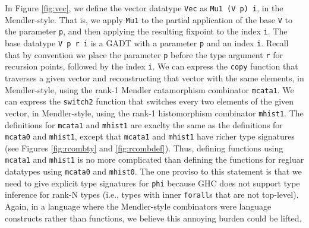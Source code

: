 \documentclass[letterpaper,12pt]{article}
\begin{document}
In Figure \ref{fig:vec}, we define the vector datatype \verb|Vec| as
\verb|Mu1 (V p) i|, in the Mendler-style.
That is, we apply \verb|Mu1| to the partial application of the base \verb|V| to
the parameter \verb|p|, and then applying the resulting fixpoint to the index \verb|i|.
The base datatype \verb|V p r i| is a GADT with a parameter \verb|p| and an index \verb|i|.
Recall that by convention we place the parameter \verb|p| before
the type argument \verb|r| for recursion points, followed by the index \verb|i|.
We can express the \verb|copy| function that traverses a given vector and
reconstructing that vector with the same elements, in Mendler-style,
using the rank-1 Mendler catamorphism combinator \verb|mcata1|.  We can express
the \verb|switch2| function that switches every two elements of the given vector,
in Mendler-style, using the rank-1 histomorphism combinator \verb|mhist1|.
The definitions for \verb|mcata1| and \verb|mhist1| are exaclty the same as
the definitions for \verb|mcata0| and \verb|mhist1|, except that \verb|mcata1| and \verb|mhist1|
have richer type signatures
(see Figures \ref{fig:rcombty} and \ref{fig:rcombdef}).
Thus, defining functions using \verb|mcata1| and \verb|mhist1| is no more complicated
than defining the functions for regluar datatypes using \verb|mcata0| and \verb|mhist0|.
The one proviso to this statement is that we need to give explicit
type signatures for \verb|phi| because GHC does not support type inference
for rank-N types (i.e., types with inner \texttt{forall}s that are not top-level).
Again, in a language where the Mendler-style combinators were
language constructs rather than functions, we believe this annoying burden
could be lifted.
\end{document}
